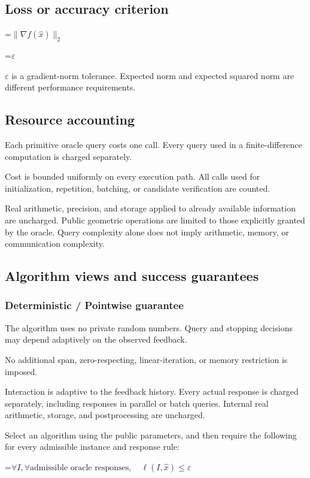 \documentclass[10pt,a4paper]{article}
\newcommand{\AtlasMath}[1]{\par\begingroup\centering\setbox0=\hbox{$\displaystyle #1$}\ifdim\wd0>1.4\linewidth\typeout{ATLAS WIDE FORMULA: \the\wd0}\fi\ifdim\wd0>\linewidth\resizebox{\linewidth}{!}{\box0}\else\box0\fi\par\endgroup}
\newcommand{\AtlasInlineMath}[1]{\begingroup\setbox0=\hbox{$#1$}\ifdim\wd0>.4\linewidth\endgroup\AtlasMath{#1}\else\endgroup$#1$\fi}
\begin{document}
\subsection{Loss or accuracy criterion}

\AtlasMath{\|\nabla f(\widehat{x})\|_2}


\AtlasInlineMath{\varepsilon} is a gradient-norm tolerance. Expected norm and expected squared norm are different performance requirements.

\subsection{Resource accounting}
Each primitive oracle query costs one call. Every query used in a finite-difference computation is charged separately.

Cost is bounded uniformly on every execution path. All calls used for initialization, repetition, batching, or candidate verification are counted.

Real arithmetic, precision, and storage applied to already available information are uncharged. Public geometric operations are limited to those explicitly granted by the oracle. Query complexity alone does not imply arithmetic, memory, or communication complexity.

\subsection{Algorithm views and success guarantees}
\subsubsection{Deterministic / Pointwise guarantee}
The algorithm uses no private random numbers. Query and stopping decisions may depend adaptively on the observed feedback.

No additional span, zero-respecting, linear-iteration, or memory restriction is imposed.

Interaction is adaptive to the feedback history. Every actual response is charged separately, including responses in parallel or batch queries. Internal real arithmetic, storage, and postprocessing are uncharged.

Select an algorithm using the public parameters, and then require the following for every admissible instance and response rule:


\AtlasMath{\forall I,\forall\text{admissible oracle responses},\quad\ell(I,\widehat{x})\le\varepsilon}
\end{document}
